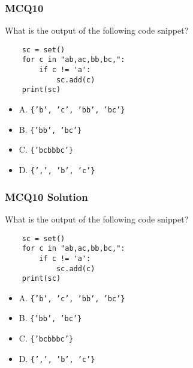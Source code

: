 \documentclass{beamer}
\begin{document}
\begin{frame}[fragile]
    \frametitle{MCQ10}
    What is the output of the following code snippet?
    \begin{verbatim}
    sc = set()
    for c in "ab,ac,bb,bc,":
        if c != 'a':
            sc.add(c)
    print(sc)
    \end{verbatim}
    \begin{itemize}
        \item A. \texttt{\{'b', 'c', 'bb', 'bc'\}}
        \item B. \texttt{\{'bb', 'bc'\}}
        \item C. \texttt{\{'bcbbbc'\}}
        \item D. \texttt{\{',', 'b', 'c'\}}
    \end{itemize}
\end{frame}
\begin{frame}[fragile]
    \frametitle{MCQ10 Solution}
    What is the output of the following code snippet?
    \begin{verbatim}
    sc = set()
    for c in "ab,ac,bb,bc,":
        if c != 'a':
            sc.add(c)
    print(sc)
    \end{verbatim}
    \begin{itemize}
        \item A. \texttt{\{'b', 'c', 'bb', 'bc'\}}
        \item B. \texttt{\{'bb', 'bc'\}}
        \item C. \texttt{\{'bcbbbc'\}}
        \item \alert{D. \texttt{\{',', 'b', 'c'\}}}
    \end{itemize}
\end{frame}
\end{document}
